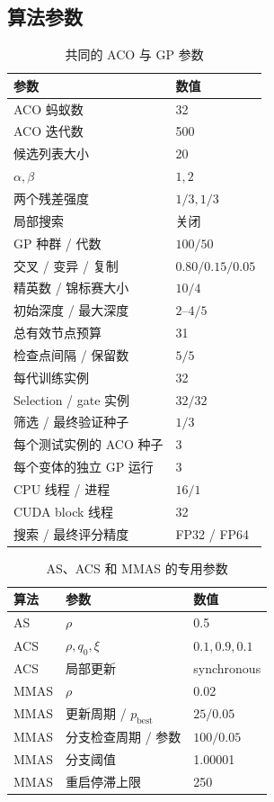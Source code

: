 \documentclass[letterpaper,journal]{IEEEtran}
\begin{document}
\subsection{算法参数}

\begin{table}[t]
\caption{共同的 ACO 与 GP 参数}
\label{tab:parameters-zh}
\centering
\footnotesize
\begin{tabular}{ll}
\toprule
参数 & 数值\\
\midrule
ACO 蚂蚁数 & 32\\
ACO 迭代数 & 500\\
候选列表大小 & 20\\
\(\alpha,\beta\) & \(1,2\)\\
两个残差强度 & \(1/3,1/3\)\\
局部搜索 & 关闭\\
GP 种群 / 代数 & \(100/50\)\\
交叉 / 变异 / 复制 & \(0.80/0.15/0.05\)\\
精英数 / 锦标赛大小 & \(10/4\)\\
初始深度 / 最大深度 & \(2\)--\(4/5\)\\
总有效节点预算 & 31\\
检查点间隔 / 保留数 & \(5/5\)\\
每代训练实例 & 32\\
Selection / gate 实例 & \(32/32\)\\
筛选 / 最终验证种子 & \(1/3\)\\
每个测试实例的 ACO 种子 & 3\\
每个变体的独立 GP 运行 & 3\\
CPU 线程 / 进程 & \(16/1\)\\
CUDA block 线程 & 32\\
搜索 / 最终评分精度 & FP32 / FP64\\
\bottomrule
\end{tabular}
\end{table}

\begin{table}[t]
\caption{AS、ACS 和 MMAS 的专用参数}
\label{tab:variant-parameters-zh}
\centering
\footnotesize
\begin{tabular}{lll}
\toprule
算法 & 参数 & 数值\\
\midrule
AS & \(\rho\) & 0.5\\
ACS & \(\rho,q_0,\xi\) & \(0.1,0.9,0.1\)\\
ACS & 局部更新 & synchronous\\
MMAS & \(\rho\) & 0.02\\
MMAS & 更新周期 / \(p_{\mathrm{best}}\) & \(25/0.05\)\\
MMAS & 分支检查周期 / 参数 & \(100/0.05\)\\
MMAS & 分支阈值 & 1.00001\\
MMAS & 重启停滞上限 & 250\\
\bottomrule
\end{tabular}
\end{table}
\end{document}
